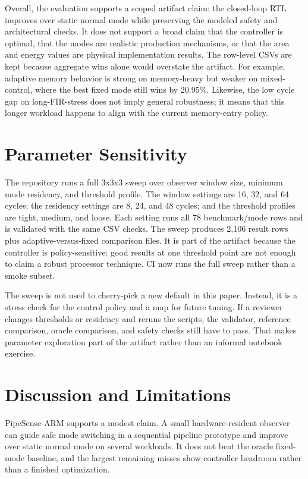 \documentclass[conference]{IEEEtran}
\newcommand{\pipesense}{PipeSense-ARM}
\begin{document}
Overall, the evaluation supports a scoped artifact claim: the closed-loop RTL improves over static normal mode while preserving the modeled safety and architectural checks. It does not support a broad claim that the controller is optimal, that the modes are realistic production mechanisms, or that the area and energy values are physical implementation results. The row-level CSVs are kept because aggregate wins alone would overstate the artifact. For example, adaptive memory behavior is strong on memory-heavy but weaker on mixed-control, where the best fixed mode still wins by 20.95\%. Likewise, the low cycle gap on long-FIR-stress does not imply general robustness; it means that this longer workload happens to align with the current memory-entry policy.

\section{Parameter Sensitivity}

The repository runs a full 3x3x3 sweep over observer window size, minimum mode residency, and threshold profile. The window settings are 16, 32, and 64 cycles; the residency settings are 8, 24, and 48 cycles; and the threshold profiles are tight, medium, and loose. Each setting runs all 78 benchmark/mode rows and is validated with the same CSV checks. The sweep produces 2,106 result rows plus adaptive-versus-fixed comparison files. It is part of the artifact because the controller is policy-sensitive: good results at one threshold point are not enough to claim a robust processor technique. CI now runs the full sweep rather than a smoke subset.

The sweep is not used to cherry-pick a new default in this paper. Instead, it is a stress check for the control policy and a map for future tuning. If a reviewer changes thresholds or residency and reruns the scripts, the validator, reference comparison, oracle comparison, and safety checks still have to pass. That makes parameter exploration part of the artifact rather than an informal notebook exercise.

\section{Discussion and Limitations}

\pipesense{} supports a modest claim. A small hardware-resident observer can guide safe mode switching in a sequential pipeline prototype and improve over static normal mode on several workloads. It does not beat the oracle fixed-mode baseline, and the largest remaining misses show controller headroom rather than a finished optimization.
\end{document}
